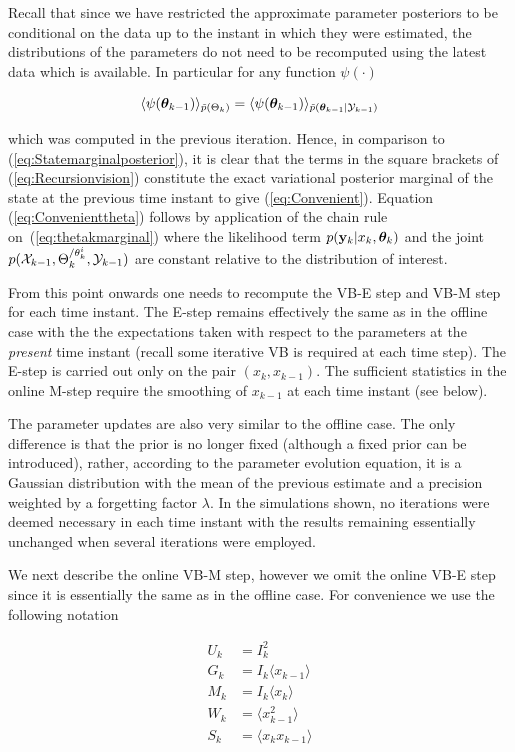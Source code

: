 \documentclass{article}
\begin{document}
Recall that since we have restricted the approximate parameter posteriors to be conditional on the data up to the instant in which they were estimated, the distributions of the parameters do not need to be recomputed using the latest data which is available. In particular for any function $\psi(\cdot)$

\begin{equation*}
\langle \psi({\bm \theta}_{k-1}) \rangle_{\tilde{p}(\Theta_{k})}  =  \langle \psi({\bm \theta}_{k-1})\rangle_{\tilde{p}({\bm \theta}_{k-1} | \mathcal{Y}_{k-1})}
\end{equation*}

\noindent which was computed in the previous iteration. Hence, in comparison to (\ref{eq:Statemarginalposterior}), it is clear that the terms in the square brackets of (\ref{eq:Recursionvision}) constitute the exact variational posterior marginal of the state at the previous time instant to give (\ref{eq:Convenient}). Equation (\ref{eq:Convenienttheta}) follows by application of the chain rule on~(\ref{eq:thetakmarginal}) where the likelihood term $p({\bf y}_k|x_k,{\bm \theta}_k)$ and the joint $p(\mathcal{X}_{k-1},\Theta_{k}^{/\theta^i_k},\mathcal{Y}_{k-1})$ are constant relative to the distribution of interest.

From this point onwards one needs to recompute the VB-E step and VB-M step for each time instant. The E-step remains effectively the same as in the offline case with the the expectations taken with respect to the parameters at the \emph{present} time instant (recall some iterative VB is required at each time step). The E-step is carried out only on the pair $(x_k,x_{k-1})$. The sufficient statistics in the online M-step require the smoothing of $x_{k-1}$ at each time instant (see below).

The parameter updates are also very similar to the offline case. The only difference is that the prior is no longer fixed (although a fixed prior can be introduced), rather, according to the parameter evolution equation, it is a Gaussian distribution with the mean of the previous estimate and a precision weighted by a forgetting factor $\lambda$. In the simulations shown, no iterations were deemed necessary in each time instant with the results remaining essentially unchanged when several iterations were employed.

We next describe the online VB-M step, however we omit the online VB-E step since it is essentially the same as in the offline case. For convenience we use the following notation

\begin{equation*}
\begin{split}
U_k &= I_k^2 \\
G_k &= I_k \langle x_{k-1} \rangle \\
M_k &= I_k \langle x_{k} \rangle \\
W_k &= \langle x_{k-1}^2 \rangle \\
S_k &= \langle x_{k}x_{k-1} \rangle \\
\end{split}
\end{equation*}
\end{document}
